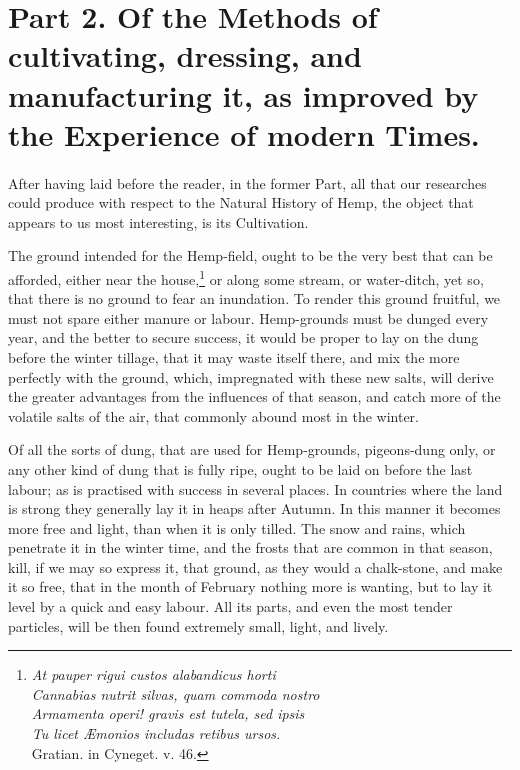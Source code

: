 \documentclass[a4paper, 11pt, oneside, polutonikogreek, english]{article}
\begin{document}
\section{Part 2. Of the Methods of cultivating, dressing, and manufacturing it, as improved by the Experience of modern Times.}
\paragraph{}
After having laid before the reader, in the former Part, all that our researches could produce with respect to the Natural History of Hemp, the object that appears to us most interesting, is its Cultivation.

The ground intended for the Hemp-field, ought to be the very best that can be afforded, either near the house,\footnote{\emph{At pauper rigui custos alabandicus horti}\\\hspace*{5mm}\emph{Cannabias nutrit silvas, quam commoda nostro}\\\hspace*{5mm}\emph{Armamenta operi! gravis est tutela, sed ipsis}\\\hspace*{5mm}\emph{Tu licet Æmonios includas retibus ursos.}\\\hspace*{5mm}Gratian. in Cyneget. v. 46.} or along some stream, or water-ditch, yet so, that there is no ground to fear an inundation. To render this ground fruitful, we must not spare either manure or labour. Hemp-grounds must be dunged every year, and the better to secure success, it would be proper to lay on the dung before the winter tillage, that it may waste itself there, and mix the more perfectly with the ground, which, impregnated with these new salts, will derive the greater advantages from the influences of that season, and catch more of the volatile salts of the air, that commonly abound most in the winter.

Of all the sorts of dung, that are used for Hemp-grounds, pigeons-dung only, or any other kind of dung that is fully ripe, ought to be laid on before the last labour; as is practised with success in several places. In countries where the land is strong they generally lay it in heaps after Autumn. In this manner it becomes more free and light, than when it is only tilled. The snow and rains, which penetrate it in the winter time, and the frosts that are common in that season, kill, if we may so express it, that ground, as they would a chalk-stone, and make it so free, that in the month of February nothing more is wanting, but to lay it level by a quick and easy labour. All its parts, and even the most tender particles, will be then found extremely small, light, and lively.
\end{document}
